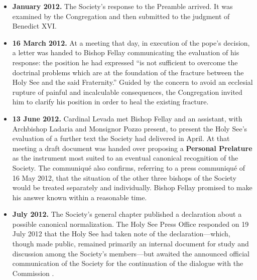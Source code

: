 \begin{itemize}
\item \textbf{January 2012.} The Society's response to the Preamble
arrived. It was examined by the Congregation and then submitted to the
judgment of Benedict XVI.
\item \textbf{16 March 2012.} At a meeting that day, in execution of the
pope's decision, a letter was handed to Bishop Fellay communicating the
evaluation of his response: the position he had expressed ``is not
sufficient to overcome the doctrinal problems which are at the foundation
of the fracture between the Holy See and the said Fraternity.'' Guided by
the concern to avoid an ecclesial rupture of painful and incalculable
consequences, the Congregation invited him to clarify his position in
order to heal the existing fracture.
\item \textbf{13 June 2012.} Cardinal Levada met Bishop Fellay and an
assistant, with Archbishop Ladaria and Monsignor Pozzo present, to
present the Holy See's evaluation of a further text the Society had
delivered in April. At that meeting a draft document was handed over
proposing a \textbf{Personal Prelature} as the instrument most suited to
an eventual canonical recognition of the Society. The communiqué also
confirms, referring to a press communiqué of 16 May 2012, that the
situation of the other three bishops of the Society would be treated
separately and individually. Bishop Fellay promised to make his answer
known within a reasonable time.
\item \textbf{July 2012.} The Society's general chapter published a
declaration about a possible canonical normalization. The Holy See Press
Office responded on 19 July 2012 that the Holy See had taken note of the
declaration---which, though made public, remained primarily an internal
document for study and discussion among the Society's members---but
awaited the announced official communication of the Society for the
continuation of the dialogue with the Commission .
\end{itemize}

